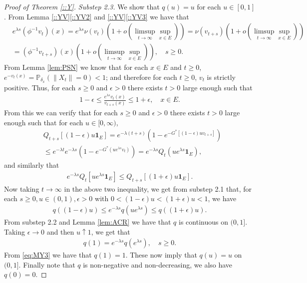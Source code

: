 \documentclass[12pt,a4paper]{amsart}
\numberwithin{equation}{section}
\theoremstyle{plain}
\theoremstyle{definition}
\theoremstyle{remark}
\begin{document}
\begin{proof}[Proof of Theorem \ref{::Y}]
\emph{Substep 2.3.}
We show that $q(u) = u$ for each $u \in [0,1]$.
From Lemma \ref{::YV}\eqref{::YV2} and \ref{::YV}\eqref{::YV3} we have that
\begin{align}
	& e^{\lambda s}(\phi^{-1}v_t)(x) 
  = e^{\lambda s}\nu(v_{t})(1+o(\limsup_{t\to \infty}\sup_{x\in E})) 
   =\nu(v_{t+s}) (1+o(\limsup_{t\to \infty}\sup_{x\in E})) \\
  & = (\phi^{-1}v_{t+s})(x) (1+o(\limsup_{t\to \infty} \sup_{x\in E}))
    , \quad s\geq 0.
\end{align}
From Lemma \ref{lem:PSN} we know that for each $x\in E$ and $t\geq 0$, $e^{-v_t(x)} = \mathbb P_{\delta_x}(\|X_t\| = 0) < 1$; and therefore for each $t\geq 0$, $v_t$ is strictly positive.
Thus, for each $s\geq 0$ and $\epsilon >0$ there exists $t>0$ large enough such that
\begin{align}
	1-\epsilon\leq \frac{e^{\lambda s}v_t(x)}{v_{t+s}(x)} 
  \leq 1+\epsilon,
  \quad x\in E.
\end{align}
From this we can verify that for each $s\geq 0$ and $\epsilon >0$ there exists $t>0$ large enough such that for each $u \in [0,\infty)$,
\begin{align}
	& Q_{t+s}[ (1-\epsilon)u\mathbf 1_E ]
   = e^{-\lambda(t+s)}( 1-e^{-G^*[(1-\epsilon)uv_{t+s}]} ) \\
  & \leq e^{-\lambda t} e^{-\lambda s}( 1- e^{-G^*(ue^{\lambda s}v_t)} )
    = e^{-\lambda s}Q_t(ue^{\lambda s} \mathbf 1_E),
\end{align}
and similarly that
\begin{align}
	e^{-\lambda s}Q_t[ue^{\lambda s}\mathbf 1_E] 
  \leq Q_{t+s}[(1+\epsilon)u\mathbf 1_E].
\end{align}
Now taking $t\to \infty$ in the above two inequality, we get from substep 2.1 that, for each $s\geq 0, u\in (0,1), \epsilon > 0$ with $0 < (1 - \epsilon) u < (1+\epsilon)u < 1$, we have
 \begin{align}
   q((1-\epsilon)u)\leq e^{-\lambda s}q(u e^{\lambda s}) \leq q((1+\epsilon)u).
 \end{align}
 From substep 2.2 and Lemma \ref{lem:ACR} we have that $q$ is continuous on $(0,1]$. 
Taking $\epsilon \to 0$ and then $u \uparrow 1$, we get that 
\begin{align}
	q(1) 
  = e^{- \lambda s} q(e^{\lambda s}), 
  \quad s \geq 0. 
\end{align} 
From \eqref{eq:MY3} we have that $q(1) = 1$.
These now imply that $q(u) = u$ on $(0,1]$.
Finally note that $q$ is non-negative and non-decreasing, we also have $q(0) = 0$.


\end{proof}
\end{document}
